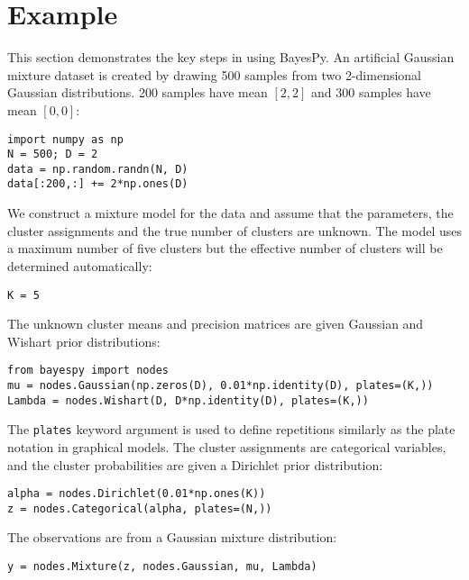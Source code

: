 \documentclass[twoside,11pt]{article}
\begin{document}










\section{Example}

This section demonstrates the key steps in using BayesPy.  An artificial
Gaussian mixture dataset is created by drawing 500 samples from two
2-dimensional Gaussian distributions.  200 samples have mean $[2, 2]$ and 300
samples have mean $[0, 0]$:
\begin{lstlisting}
import numpy as np
N = 500; D = 2
data = np.random.randn(N, D)
data[:200,:] += 2*np.ones(D)
\end{lstlisting}
We construct a mixture model for the data and assume that the parameters, the
cluster assignments and the true number of clusters are unknown.  The model uses
a maximum number of five clusters but the effective number of clusters will be
determined automatically:
\begin{lstlisting}
K = 5
\end{lstlisting}
The unknown cluster means and precision matrices are given Gaussian and Wishart
prior distributions:
\begin{lstlisting}
from bayespy import nodes
mu = nodes.Gaussian(np.zeros(D), 0.01*np.identity(D), plates=(K,))
Lambda = nodes.Wishart(D, D*np.identity(D), plates=(K,))
\end{lstlisting}
The \texttt{plates} keyword argument is used to define repetitions similarly as
the plate notation in graphical models.  The cluster assignments are categorical
variables, and the cluster probabilities are given a Dirichlet prior
distribution:
\begin{lstlisting}
alpha = nodes.Dirichlet(0.01*np.ones(K))
z = nodes.Categorical(alpha, plates=(N,))
\end{lstlisting}
The observations are from a Gaussian mixture distribution:
\begin{lstlisting}
y = nodes.Mixture(z, nodes.Gaussian, mu, Lambda)
\end{lstlisting}
\end{document}
